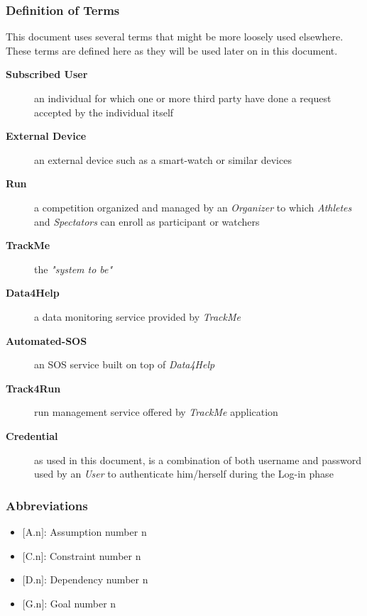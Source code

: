 \documentclass[a4paper]{article}
\begin{document}
            \subsubsection{Definition of Terms}
            This document uses several terms that might be more loosely used elsewhere. These terms are defined here as they will be used later on in this document.
                \begin{description}
                    \item[\textbf{Subscribed User}] an individual for which one or more third party have done a request accepted by the individual itself
                    
                    \item[\textbf{External Device}] an external device such as a smart-watch or similar devices
                    
                    \item[\textbf{Run}] a competition organized and managed by an \textit{Organizer} to which \textit{Athletes} and \textit{Spectators} can enroll as participant or watchers
                    
                    \item[\textbf{TrackMe}] the \textit{"system to be"}
                    
                    \item[\textbf{Data4Help}] a data monitoring service provided by \textit{TrackMe}
                    
                    \item[\textbf{Automated-SOS}] an SOS service built on top of \textit{Data4Help}
                    
                    \item[\textbf{Track4Run}] run management service offered by \textit{TrackMe} application
                    
                    \item[\textbf{Credential}] as used in this document, is a combination of both username and password used by an \textit{User} to authenticate him/herself during the Log-in phase
                \end{description}
                
            \subsubsection{Abbreviations}
            \begin{itemize}
                \item $[$A.n$]$: Assumption number n
                \item $[$C.n$]$: Constraint number n
                \item $[$D.n$]$: Dependency number n
                \item $[$G.n$]$: Goal number n
            \end{itemize}
            
\end{document}
